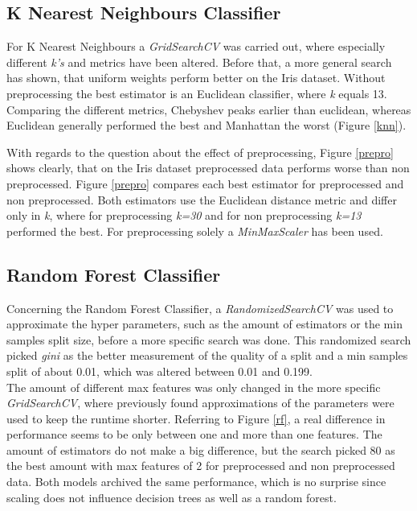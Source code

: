 
\subsection{K Nearest Neighbours Classifier}
For K Nearest Neighbours a \textit{GridSearchCV} was carried out, where especially different \textit{k's} and metrics have been altered. Before that, a more general search has shown, that uniform weights perform better on the Iris dataset. Without preprocessing the best estimator is an Euclidean classifier, where \textit{k} equals 13. Comparing the different metrics, Chebyshev peaks earlier than euclidean, whereas Euclidean generally performed the best and Manhattan the worst (Figure \ref{knn}). 


With regards to the question about the effect of preprocessing, Figure \ref{prepro} shows clearly, that on the Iris dataset preprocessed data performs worse than non preprocessed. Figure \ref{prepro} compares each best estimator for preprocessed and non preprocessed. Both estimators use the Euclidean distance metric and differ only in \textit{k}, where for preprocessing \textit{k=30} and for non preprocessing \textit{k=13} performed the best.  For preprocessing solely a \textit{MinMaxScaler} has been used.


\subsection{Random Forest Classifier}
Concerning the Random Forest Classifier, a \textit{RandomizedSearchCV} was used to approximate the hyper parameters, such as the amount of estimators or the min samples split size, before a more specific search was done. This randomized search picked \textit{gini} as the better measurement of the quality of  a split and a min samples split of about 0.01, which was altered between 0.01 and 0.199. \\
The amount of different max features was only changed in the more specific \textit{GridSearchCV}, where previously found approximations of the parameters were used to keep the runtime shorter. Referring to Figure \ref{rf}, a real difference in performance seems to be only between one and more than one features. The amount of estimators do not make a big difference, but the search picked 80 as the best amount with max features of 2 for preprocessed and non preprocessed data. Both models archived the same performance, which is no surprise since scaling does not influence decision trees as well as a random forest.

